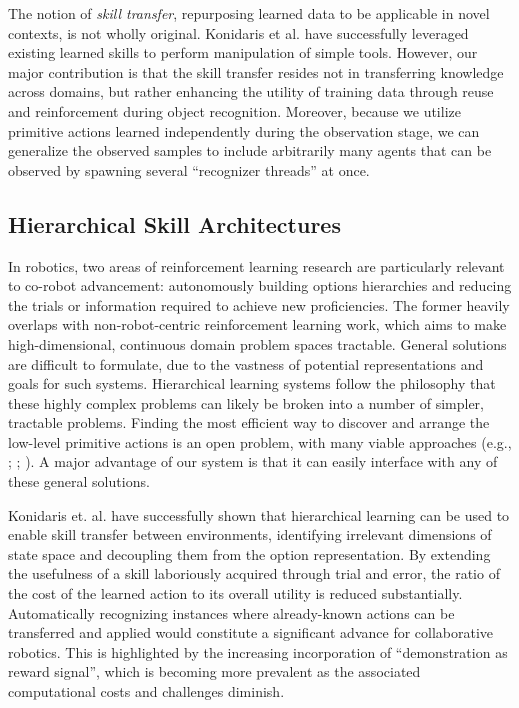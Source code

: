\documentclass[letterpaper]{article}
\begin{document}
  The notion of \textit{skill transfer}, repurposing learned data to be applicable in novel contexts, is not wholly original.  Konidaris et al.  have successfully leveraged existing learned skills to perform manipulation of simple tools. However, our major contribution is that the skill transfer resides not in transferring knowledge across domains, but rather enhancing the utility of training data through reuse and reinforcement during object recognition. Moreover, because we utilize primitive actions learned independently during the observation stage, we can generalize the observed samples to include arbitrarily many agents that can be observed by spawning several ``recognizer threads'' at once.


\subsection{Hierarchical Skill Architectures}
  In robotics, two areas of reinforcement learning research are particularly relevant to co-robot advancement: autonomously building options hierarchies and reducing the trials or information required to achieve new proficiencies. The former heavily overlaps with non-robot-centric reinforcement learning work, which aims to make high-dimensional, continuous domain problem spaces tractable. General solutions are difficult to formulate, due to the vastness of potential representations and goals for such systems. Hierarchical learning systems follow the philosophy that these highly complex problems can likely be broken into a number of simpler, tractable problems. Finding the most efficient way to discover and arrange the low-level primitive actions is an open problem, with many viable approaches (e.g., \citeauthor{LearningHierarchicalControl} \citeyear{LearningHierarchicalControl}; \citeauthor{EfficientSkillLearning} \citeyear{EfficientSkillLearning}; \citeauthor{AutoHierarchyLearning} \citeyear{AutoHierarchyLearning}).  A major advantage of our system is that it can easily interface with any of these general solutions.

  Konidaris et. al.  have successfully shown that hierarchical learning can be used to enable skill transfer between environments, identifying irrelevant dimensions of state space and decoupling them from the option representation. By extending the usefulness of a skill laboriously acquired through trial and error, the ratio of the cost of the learned action to its overall utility is reduced substantially. Automatically recognizing instances where already-known actions can be transferred and applied would constitute a significant advance for collaborative robotics. This is highlighted by the increasing incorporation of ``demonstration as reward signal'', which is becoming more prevalent as the associated computational costs and challenges diminish. 
	
\end{document}
